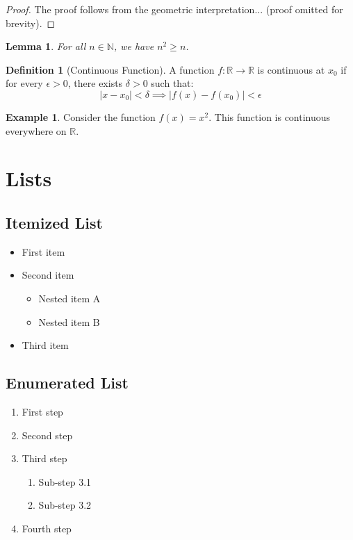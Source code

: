 \documentclass[12pt,a4paper]{article}
\newtheorem{lemma}[theorem]{Lemma}
\theoremstyle{definition}
\newtheorem{definition}{Definition}[section]
\newtheorem{example}{Example}[section]
\theoremstyle{remark}
\newcommand{\R}{\mathbb{R}}
\newcommand{\N}{\mathbb{N}}
\begin{document}
\begin{proof}
The proof follows from the geometric interpretation... (proof omitted for brevity).
\end{proof}

\begin{lemma}
\label{lem:example}
For all $n \in \N$, we have $n^2 \geq n$.
\end{lemma}

\begin{definition}[Continuous Function]
A function $f: \R \to \R$ is continuous at $x_0$ if for every $\epsilon > 0$, there exists $\delta > 0$ such that:
\[
|x - x_0| < \delta \implies |f(x) - f(x_0)| < \epsilon
\]
\end{definition}

\begin{example}
Consider the function $f(x) = x^2$. This function is continuous everywhere on $\R$.
\end{example}

\section{Lists}

\subsection{Itemized List}

\begin{itemize}
    \item First item
    \item Second item
    \begin{itemize}
        \item Nested item A
        \item Nested item B
    \end{itemize}
    \item Third item
\end{itemize}

\subsection{Enumerated List}

\begin{enumerate}
    \item First step
    \item Second step
    \item Third step
    \begin{enumerate}
        \item Sub-step 3.1
        \item Sub-step 3.2
    \end{enumerate}
    \item Fourth step
\end{enumerate}
\end{document}

